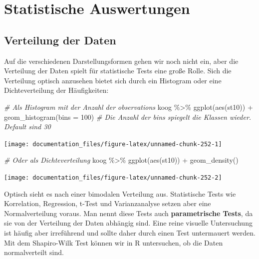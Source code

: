 \documentclass[
]{article}
\newenvironment{Shaded}{\begin{snugshade}}{\end{snugshade}}
\newcommand{\AttributeTok}[1]{\textcolor[rgb]{0.77,0.63,0.00}{#1}}
\newcommand{\CommentTok}[1]{\textcolor[rgb]{0.56,0.35,0.01}{\textit{#1}}}
\newcommand{\DecValTok}[1]{\textcolor[rgb]{0.00,0.00,0.81}{#1}}
\newcommand{\FunctionTok}[1]{\textcolor[rgb]{0.00,0.00,0.00}{#1}}
\newcommand{\NormalTok}[1]{#1}
\newcommand{\SpecialCharTok}[1]{\textcolor[rgb]{0.00,0.00,0.00}{#1}}
\begin{document}
\hypertarget{statistische-auswertungen}{%
\section{Statistische Auswertungen}\label{statistische-auswertungen}}

\hypertarget{verteilung-der-daten}{%
\subsection{Verteilung der Daten}\label{verteilung-der-daten}}

Auf die verschiedenen Darstellungsformen gehen wir noch nicht ein, aber die Verteilung der Daten spielt für statistische Tests eine große Rolle. Sich die Verteilung optisch anzusehen bietet sich durch ein Histogram oder eine Dichteverteilung der Häufigkeiten:

\begin{Shaded}
\begin{Highlighting}[]
\CommentTok{\# Als Histogram mit der Anzahl der observations}
\NormalTok{koog }\SpecialCharTok{\%\textgreater{}\%}
  \FunctionTok{ggplot}\NormalTok{(}\FunctionTok{aes}\NormalTok{(st10)) }\SpecialCharTok{+}
  \FunctionTok{geom\_histogram}\NormalTok{(}\AttributeTok{bins =} \DecValTok{100}\NormalTok{) }\CommentTok{\# Die Anzahl der bins spiegelt die Klassen wieder. Default sind 30 }
\end{Highlighting}
\end{Shaded}

\begin{center}\texttt{[image: documentation\_files/figure-latex/unnamed-chunk-252-1]} \end{center}

\begin{Shaded}
\begin{Highlighting}[]

\CommentTok{\# Oder als Dichteverteilung}
\NormalTok{koog }\SpecialCharTok{\%\textgreater{}\%}
  \FunctionTok{ggplot}\NormalTok{(}\FunctionTok{aes}\NormalTok{(st10)) }\SpecialCharTok{+}
  \FunctionTok{geom\_density}\NormalTok{()}
\end{Highlighting}
\end{Shaded}

\begin{center}\texttt{[image: documentation\_files/figure-latex/unnamed-chunk-252-2]} \end{center}

Optisch sieht es nach einer bimodalen Verteilung aus. Statistische Tests wie Korrelation, Regression, t-Test und Varianzanalyse setzen aber eine Normalverteilung voraus. Man nennt diese Tests auch \textbf{parametrische Tests}, da sie von der Verteilung der Daten abhängig sind. Eine reine visuelle Untersuchung ist häufig aber irreführend und sollte daher durch einen Test untermauert werden. Mit dem Shapiro-Wilk Test können wir in R untersuchen, ob die Daten normalverteilt sind.
\end{document}
